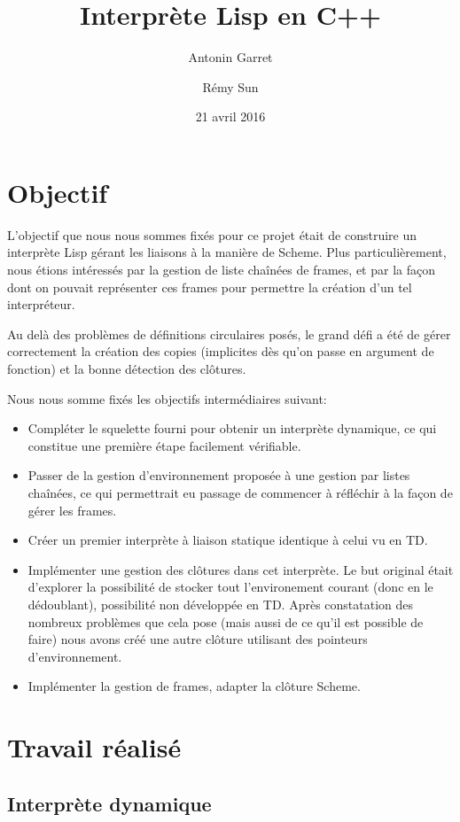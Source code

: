 \documentclass[a4paper,11pt]{article}
\title{Interprète Lisp en C++}
\author{Antonin Garret \and Rémy Sun}
\date{21 avril 2016}
\begin{document}
\maketitle

\section{Objectif}

L'objectif que nous nous sommes fixés pour ce projet était de construire un
interprète Lisp gérant les liaisons à la manière de Scheme. Plus
particulièrement, nous étions intéressés par la gestion de liste chaînées de
frames, et par la façon dont on pouvait représenter ces frames pour permettre la
création d'un tel interpréteur.

Au delà des problèmes de définitions circulaires posés, le grand défi a été de
gérer correctement la création des copies (implicites dès qu'on passe en
argument de fonction) et la bonne détection des clôtures.

Nous nous somme fixés les objectifs intermédiaires suivant:
\begin{itemize}
\item Compléter le squelette fourni pour obtenir un interprète dynamique, ce qui
  constitue une première étape facilement vérifiable.
\item Passer de la gestion d'environnement proposée à une gestion par listes
  chaînées, ce qui permettrait eu passage de commencer à réfléchir à la façon de
  gérer les frames.
\item Créer un premier interprète à liaison statique identique à celui vu en TD.
\item Implémenter une gestion des clôtures dans cet interprète. Le but original
  était d'explorer la possibilité de stocker tout l'environement courant (donc
  en le dédoublant), possibilité non développée en TD. Après constatation des
  nombreux problèmes que cela pose (mais aussi de ce qu'il est possible de
  faire) nous avons créé une autre clôture utilisant des pointeurs
  d’environnement.
\item Implémenter la gestion de frames, adapter la clôture Scheme.
\end{itemize}


\section{Travail réalisé}

\subsection{Interprète dynamique}
\end{document}

